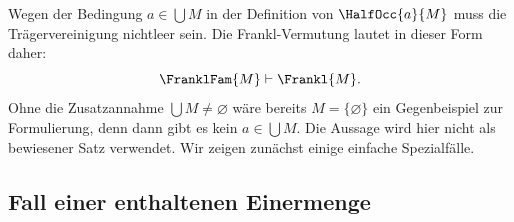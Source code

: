 \documentclass[main.tex]{subfiles}
\begin{document}
\begin{tabproof}
\end{tabproof}

\begin{tabproof}
\end{tabproof}

\begin{tabproof}
\end{tabproof}

\begin{tabproof}
\end{tabproof}

Wegen der Bedingung \(a\in\bigcup M\) in der Definition von
\(\HalfOcc{a}{M}\) muss die Trägervereinigung nichtleer sein. Die
Frankl-Vermutung lautet in dieser Form daher:
\[
  \FranklFam{M}\vdash \Frankl{M}.
\]
Ohne die Zusatzannahme \(\bigcup M\neq\varnothing\) wäre bereits
\(M=\{\varnothing\}\) ein Gegenbeispiel zur Formulierung, denn dann gibt es
kein \(a\in\bigcup M\). Die Aussage wird hier nicht als bewiesener Satz
verwendet. Wir zeigen zunächst einige einfache Spezialfälle.

\subsection{Fall einer enthaltenen Einermenge}
\end{document}
